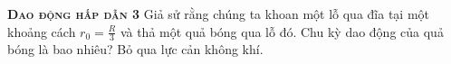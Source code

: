 \begin{problem}
\textbf{\textsc{Dao động hấp dẫn 3}} 
Giả sử rằng chúng ta khoan một lỗ qua đĩa tại một khoảng cách \(r_0= \frac{R}{3}\) và thả một quả bóng qua lỗ đó. Chu kỳ dao động của quả bóng là bao nhiêu? Bỏ qua lực cản không khí.

\end{problem}
